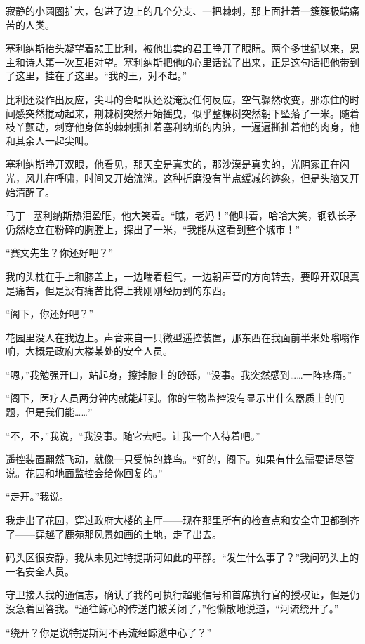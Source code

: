 \documentclass[AutoFakeBold=true]{book}
\begin{document}
寂静的小圆圈扩大，包进了边上的几个分支、一把棘刺，那上面挂着一簇簇极端痛苦的人类。

塞利纳斯抬头凝望着悲王比利，被他出卖的君王睁开了眼睛。两个多世纪以来，恩主和诗人第一次互相对望。塞利纳斯把他的心里话说了出来，正是这句话把他带到了这里，挂在了这里。``我的王，对不起。''

比利还没作出反应，尖叫的合唱队还没淹没任何反应，空气骤然改变，那冻住的时间感突然搅动起来，荆棘树突然开始摇曳，似乎整棵树突然朝下坠落了一米。随着枝丫颤动，刺穿他身体的棘刺撕扯着塞利纳斯的内脏，一遍遍撕扯着他的肉身，他和其余人一起尖叫。

塞利纳斯睁开双眼，他看见，那天空是真实的，那沙漠是真实的，光阴冢正在闪光，风儿在呼啸，时间又开始流淌。这种折磨没有半点缓减的迹象，但是头脑又开始清醒了。

马丁·塞利纳斯热泪盈眶，他大笑着。``瞧，老妈！''他叫着，哈哈大笑，钢铁长矛仍然屹立在粉碎的胸膛上，探出了一米，``我能从这看到整个城市！''

\vspace*{1em}

``赛文先生？你还好吧？''

我的头枕在手上和膝盖上，一边喘着粗气，一边朝声音的方向转去，要睁开双眼真是痛苦，但是没有痛苦比得上我刚刚经历到的东西。

``阁下，你还好吧？''

花园里没人在我边上。声音来自一只微型遥控装置，那东西在我面前半米处嗡嗡作响，大概是政府大楼某处的安全人员。

``嗯，''我勉强开口，站起身，擦掉膝上的砂砾，``没事。我突然感到……一阵疼痛。''

``阁下，医疗人员两分钟内就能赶到。你的生物监控没有显示出什么器质上的问题，但是我们能……''

``不，不，''我说，``我没事。随它去吧。让我一个人待着吧。''

遥控装置翩然飞动，就像一只受惊的蜂鸟。``好的，阁下。如果有什么需要请尽管说。花园和地面监控会给你回复的。''

``走开。''我说。

我走出了花园，穿过政府大楼的主厅——现在那里所有的检查点和安全守卫都到齐了——穿越了鹿苑那风景如画的土地，走了出去。

码头区很安静，我从未见过特提斯河如此的平静。``发生什么事了？''我问码头上的一名安全人员。

守卫接入我的通信志，确认了我的可执行超驰信号和首席执行官的授权证，但是仍没急着回答我。``通往鲸心的传送门被关闭了，''他懒散地说道，``河流绕开了。''

``绕开？你是说特提斯河不再流经鲸逖中心了？''
\end{document}
